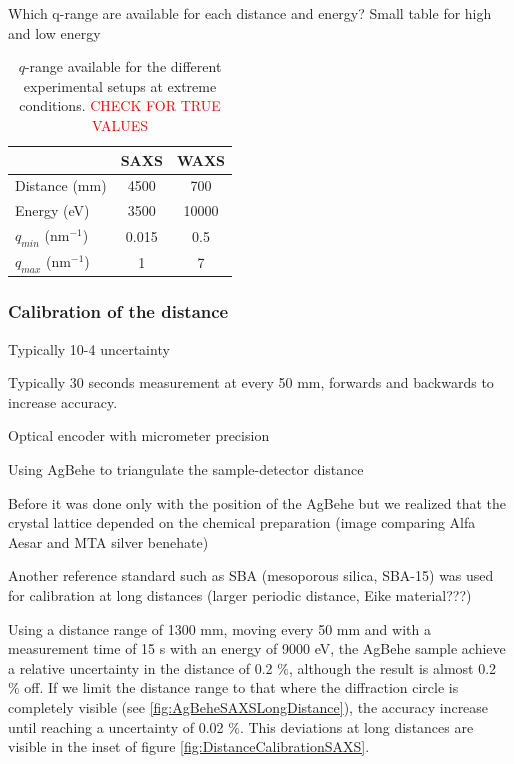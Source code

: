 Which q-range are available for each distance and energy? Small table for high and low energy

\begin{table}[]
\centering
\caption{$q$-range available for the different experimental setups at extreme conditions. \textcolor{red}{CHECK FOR TRUE VALUES}}
\label{tab:qrange}
\begin{tabular}{|l|c|c|}
\hline
              & \textbf{SAXS} & \textbf{WAXS} \\ \hline
Distance (mm) & 4500          & 700           \\ \hline
Energy (eV)   & 3500          & 10000         \\ \hline
$q_{min}$ (nm$^{-1}$)   & 0.015         & 0.5           \\ \hline
$q_{max}$ (nm$^{-1}$)   & 1             & 7             \\ \hline
\end{tabular}
\end{table}


\subsubsection{Calibration of the distance}

Typically 10-4 uncertainty

Typically 30 seconds measurement at every 50 mm, forwards and backwards to increase accuracy.

Optical encoder with micrometer precision

Using AgBehe to triangulate the sample-detector distance

Before it was done only with the position of the AgBehe but we realized that the crystal lattice depended on the chemical preparation (image comparing Alfa Aesar and MTA silver benehate)

Another reference standard such as SBA (mesoporous silica, SBA-15) was used for calibration at long distances (larger periodic distance, Eike material???)

Using a distance range of 1300 mm, moving every 50 mm and with a measurement time of 15 s with an energy of 9000 eV, the AgBehe sample achieve a relative uncertainty in the distance of 0.2 $\%$, although the result is almost 0.2 $\%$ off. If we limit the distance range to that where the diffraction circle is completely visible (see \ref{fig:AgBeheSAXSLongDistance}), the accuracy increase until reaching a uncertainty of 0.02 $\%$. This deviations at long distances are visible in the inset of figure \ref{fig:DistanceCalibrationSAXS}.


